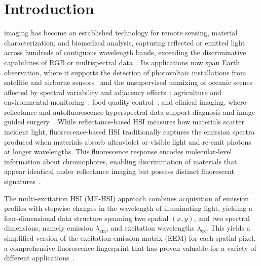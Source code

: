 \section{Introduction}
\label{sec:introduction}

 imaging has become an established technology for remote sensing, material characterization, and biomedical analysis, capturing reflected or emitted light across hundreds of contiguous wavelength bands, exceeding the discriminative capabilities of RGB or multispectral data~\cite{hong2026hyperspectral,hong2024spectralgpt}.
Its applications now span Earth observation, where it supports the detection of photovoltaic installations from satellite and airborne sensors~\cite{joerges2023photovoltaic} and the unsupervised unmixing of oceanic scenes affected by spectral variability and adjacency effects~\cite{deville2023oceanic}; agriculture and environmental monitoring~\cite{lu2020agriculture,lekha2026environmental}; food quality control~\cite{sun2024foodindustry}; and clinical imaging, where reflectance and autofluorescence hyperspectral data support diagnosis and image-guided surgery~\cite{yoon2022clinical,campbell2023beyondoncology}.
While reflectance-based HSI measures how materials scatter
incident light, fluorescence-based HSI traditionally captures the emission spectra produced when materials absorb ultraviolet or visible light and re-emit photons at longer wavelengths.
This fluorescence response encodes molecular-level information about chromophores, enabling discrimination of materials that appear identical under reflectance imaging but possess distinct fluorescent signatures~\cite{muselimyan2016,gil2017}.

The multi-excitation HSI (ME-HSI) approach combines
acquisition of emission profiles with stepwise changes in the
wavelength of illuminating light, yielding a four-dimensional data structure spanning two spatial $(x, y)$, and two spectral dimensions, namely emission $\lambda_{\text{em}}$, and excitation wavelengths $\lambda_{\text{ex}}$.
This yields a simplified version of the excitation-emission matrix (EEM) for each spatial pixel, a comprehensive fluorescence fingerprint that has proven valuable for a variety of different applications~\cite{lakowicz2006principles,swift2018}.

